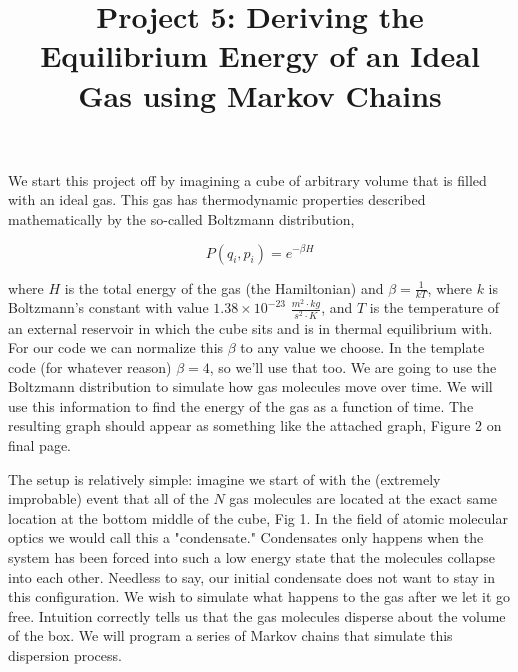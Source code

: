 \documentclass[11pt]{amsart}
\title{Project 5: Deriving the Equilibrium Energy of an Ideal Gas using Markov Chains}
\begin{document}
\maketitle

We start this project off by imagining a cube of arbitrary volume that is filled with an ideal gas.  This gas has thermodynamic properties described mathematically by the so-called Boltzmann distribution, 

\begin{equation}
P(q_i,p_i)=e^{-\beta H}
\end{equation}
\vspace{2 mm}

where $H$ is the total energy of the gas (the Hamiltonian) and $\beta = \frac{1}{kT}$, where $k$ is Boltzmann's constant with value $1.38 \times 10^{-23}$ $\frac{m^2 \cdot kg}{s^2 \cdot K}$, and $T$ is the temperature of an external reservoir in which the cube sits and is in thermal equilibrium with.  For our code we can normalize this $\beta$ to any value we choose.  In the template code (for whatever reason) $\beta = 4$, so we'll use that too.  We are going to use the Boltzmann distribution to simulate how gas molecules move over time.  We will use this information to find the energy of the gas as a function of time.  The resulting graph should appear as something like the attached graph, Figure 2 on final page.
\newline

The setup is relatively simple: imagine we start of with the (extremely improbable) event that all of the $N$ gas molecules are located at the exact same location at the bottom middle of the cube, Fig 1.  In the field of atomic molecular optics we would call this a "condensate."  Condensates only happens when the system has been forced into such a low energy state that the molecules collapse into each other.  Needless to say, our initial condensate does not want to stay in this configuration.  We wish to simulate what happens to the gas after we let it go free.  Intuition correctly tells us that the gas molecules disperse about the volume of the box.  We will program a series of Markov chains that simulate this dispersion process.
\newline
\end{document}
